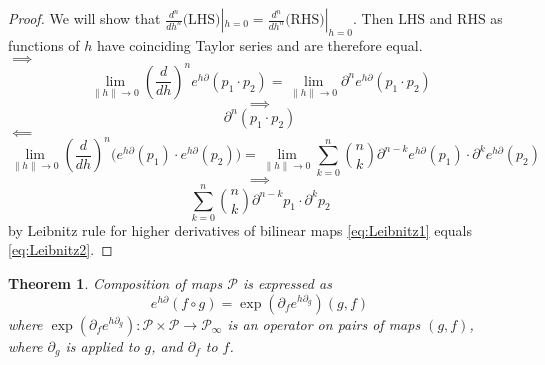 \documentclass{article}
\newcommand{\dP}{\mathcal{P}}
\newcommand{\D}{\partial}
\newtheorem{izrek}{Theorem}[section]
\begin{document}
 \begin{proof}
 We will show that $\frac{d^n}{dh^n}\text{(LHS)}|_{h=0}=\frac{d^n}{dh^n}\text{(RHS)}|_{h=0}$. Then $\text{LHS}$ and $\text{RHS}$ as functions
 of $h$ have coinciding Taylor series and are therefore equal.\\
  $\implies$
  $$\lim\limits_{\lVert h\rVert\to 0}(\frac{d}{dh})^ne^{h\D}(p_1\cdot p_2)=\lim\limits_{\lVert h\rVert\to 0}\D^ne^{h\D}(p_1\cdot p_2)$$
  $$\implies$$
  \begin{equation}\label{eq:Leibnitz1}
  \D^n(p_1\cdot p_2)
  \end{equation}
  $\impliedby$
  $$\lim\limits_{\lVert h\rVert\to 0}(\frac{d}{dh})^n\Big(e^{h\D}(p_1)\cdot e^{h\D}(p_2)\Big)=\lim\limits_{\lVert h\rVert\to 0}\sum\limits_{k=0}^{n}{n\choose k}\D^{n-k}e^{h\D}(p_1)\cdot \D^ke^{h\D}(p_2)$$
  $$\implies$$
  \begin{equation}\label{eq:Leibnitz2}
  \sum\limits_{k=0}^{n}{n\choose k}\D^{n-k}p_1\cdot \D^kp_2
  \end{equation}
  by Leibnitz rule for higher derivatives of bilinear maps \eqref{eq:Leibnitz1} equals \eqref{eq:Leibnitz2}.
 \end{proof}
 
 \begin{izrek}\label{izr:kompo}
 Composition of maps $\dP$ is expressed as
 \begin{equation}\label{eq:kompo}
 e^{h\D}(f\circ g)=\exp(\D_fe^{h\D_g})(g,f)
 \end{equation}
 where $\exp(\D_fe^{h\D_g}):\dP\times\dP\to\dP_\infty$ is an operator on pairs of maps $(g,f)$, where $\D_g$ is applied to $g$, and $\D_f$ to $f$. 
 \end{izrek}
 
\end{document}
